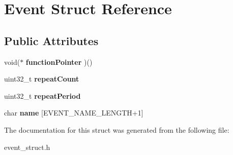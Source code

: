 \hypertarget{struct_event}{}\section{Event Struct Reference}
\label{struct_event}
\subsection*{Public Attributes}
\begin{DoxyCompactItemize}
\item 
\mbox{\label{struct_event_aa95bd44817d85071dc8154075c4e00d8}} 
void($\ast$ {\bfseries function\+Pointer} )()
\item 
\mbox{\label{struct_event_acb954e9654bc45346272a58edda5dbbb}} 
uint32\+\_\+t {\bfseries repeat\+Count}
\item 
\mbox{\label{struct_event_acd784b5ade59e92201ef255c94791635}} 
uint32\+\_\+t {\bfseries repeat\+Period}
\item 
\mbox{\label{struct_event_a71e1082a4bb993bfdd45ddf7748b236e}} 
char {\bfseries name} \mbox{[}E\+V\+E\+N\+T\+\_\+\+N\+A\+M\+E\+\_\+\+L\+E\+N\+G\+TH+1\mbox{]}
\end{DoxyCompactItemize}


The documentation for this struct was generated from the following file\+:\begin{DoxyCompactItemize}
\item 
event\+\_\+struct.\+h\end{DoxyCompactItemize}
